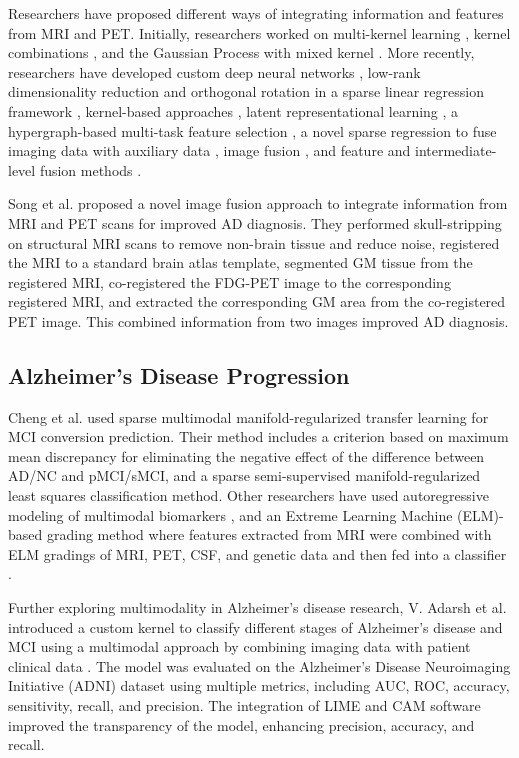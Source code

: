 Researchers have proposed different ways of integrating information and features from MRI and PET. Initially, researchers worked on multi-kernel learning \cite{hinrichs_predictive_2011}, kernel combinations \cite{zhang_multi-modal_2012}, and the Gaussian Process with mixed kernel \cite{young_accurate_2013}. More recently, researchers have developed custom deep neural networks \cite{lu_multimodal_2018}, low-rank dimensionality reduction and orthogonal rotation in a sparse linear regression framework \cite{zhu_low-rank_2019}, kernel-based approaches \cite{gupta_prediction_2019}, latent representational learning \cite{zhou_latent_2019}, a hypergraph-based multi-task feature selection \cite{shao_hypergraph_2020},\cite{zu_label-aligned_2016} a novel sparse regression to fuse imaging data with auxiliary data \cite{shen_heterogeneous_2021}, image fusion \cite{song_effective_2021}, and feature and intermediate-level fusion methods \cite{singh_multi-modal_2023}.

Song et al. \cite{song_effective_2021} proposed a novel image fusion approach to integrate information from MRI and PET scans for improved AD diagnosis. They performed skull-stripping on structural MRI scans to remove non-brain tissue and reduce noise, registered the MRI to a standard brain atlas template, segmented GM tissue from the registered MRI, co-registered the FDG-PET image to the corresponding registered MRI, and extracted the corresponding GM area from the co-registered PET image. This combined information from two images improved AD diagnosis.

\subsection{Alzheimer's Disease Progression}
Cheng et al. \cite{cheng_multimodal_2015} used sparse multimodal manifold-regularized transfer learning for MCI conversion prediction. Their method includes a criterion based on maximum mean discrepancy for eliminating the negative effect of the difference between AD/NC and pMCI/sMCI, and a sparse semi-supervised manifold-regularized least squares classification method. Other researchers have used autoregressive modeling of multimodal biomarkers \cite{minhas_predicting_2018}, and an Extreme Learning Machine (ELM)-based grading method where features extracted from MRI were combined with ELM gradings of MRI, PET, CSF, and genetic data and then fed into a classifier \cite{lin_predicting_2020}.

Further exploring multimodality in Alzheimer's disease research, V. Adarsh et al. introduced a custom kernel to classify different stages of Alzheimer’s disease and MCI using a multimodal approach by combining imaging data with patient clinical data \cite{adarsh_multimodal_2024}. The model was evaluated on the Alzheimer’s Disease Neuroimaging Initiative (ADNI) dataset using multiple metrics, including AUC, ROC, accuracy, sensitivity, recall, and precision. The integration of LIME and CAM software improved the transparency of the model, enhancing precision, accuracy, and recall.

